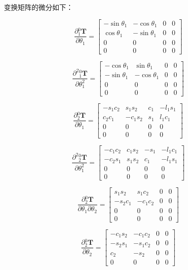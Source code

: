 \documentclass{homework}
\begin{document}
\begin{sol}
变换矩阵的微分如下：

\[
  \frac{\partial {_1^0}\mathbf{T}}{\partial \theta_1} =
  \begin{bmatrix}
    -\sin\theta_1 & -\cos\theta_1 & 0 & 0 \\
    \cos\theta_1 & -\sin\theta_1 & 0 & 0 \\
    0 & 0 & 0 & 0 \\
    0 & 0 & 0 & 0
  \end{bmatrix}
\]

\[
  \frac{\partial^2 {_1^0}\mathbf{T}}{\partial \theta_1^2} =
  \begin{bmatrix}
    -\cos\theta_1 & \sin\theta_1 & 0 & 0 \\
    -\sin\theta_1 & -\cos\theta_1 & 0 & 0 \\
    0 & 0 & 0 & 0 \\
    0 & 0 & 0 & 0
  \end{bmatrix}
\]

\[
  \frac{\partial {_2^0}\mathbf{T}}{\partial \theta_1} =
  \begin{bmatrix} 
    -s_{1} c_{2} & s_{1} s_{2} & c_{1} & -l_{1} s_{1} \\ 
    c_{2} c_{1} & -c_{1} s_{2} & s_{1} & l_{1} c_{1} \\ 
    0 & 0 & 0 & 0 \\ 
    0 & 0 & 0 & 0
  \end{bmatrix}
\]

\[
  \frac{\partial^2 {_2^0}\mathbf{T}}{\partial \theta_1^2} =
  \begin{bmatrix} 
    -c_{1} c_{2} & c_{1} s_{2} & -s_{1} & -l_{1} c_{1} \\ 
    -c_{2} s_{1} & s_{1} s_{2} & c_{1} & -l_{1} s_{1} \\ 
    0 & 0 & 0 & 0 \\ 
    0 & 0 & 0 & 0
  \end{bmatrix}
\]

\[
  \frac{\partial {_2^0}\mathbf{T}}{\partial \theta_1 \partial \theta_2} =
  \begin{bmatrix} 
    s_{1} s_{2} & s_{1} c_{2} & 0 & 0 \\ 
    -s_{2} c_{1} & -c_{1} c_{2} & 0 & 0 \\ 
    0 & 0 & 0 & 0 \\ 
    0 & 0 & 0 & 0
  \end{bmatrix}
\]

\[
  \frac{\partial {_2^0}\mathbf{T}}{\partial \theta_2} =
  \begin{bmatrix} 
    -c_{1} s_{2} & -c_{1} c_{2} & 0 & 0 \\ 
    -s_{2} s_{1} & -s_{1} c_{2} & 0 & 0 \\ 
    c_{2} & -s_{2} & 0 & 0 \\ 
    0 & 0 & 0 & 0
  \end{bmatrix}
\]


\end{sol}
\end{document}
